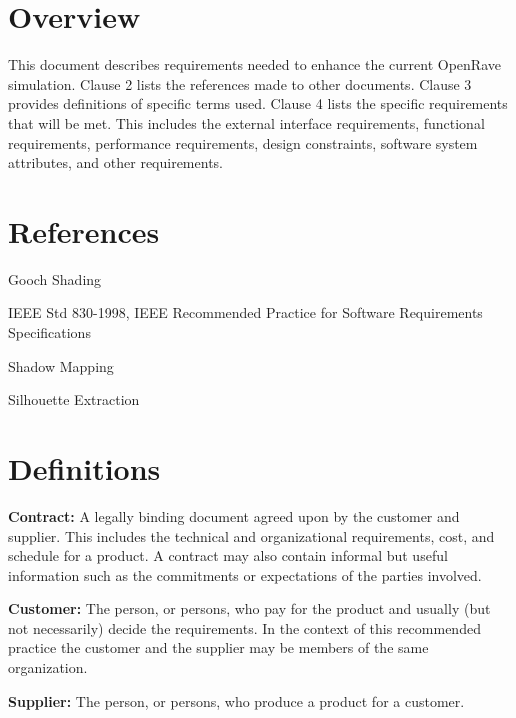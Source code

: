 \documentclass[10pt,journal,compsoc]{IEEEtran}
\begin{document}
\newpage
\begin{flushleft}
\section{Overview}
\vspace{3mm}
This document describes requirements needed to enhance the current OpenRave simulation. 
Clause 2 lists the references made to other documents. 
Clause 3 provides definitions of specific terms used.
Clause 4 lists the specific requirements that will be met.
This includes the external interface requirements, functional requirements, performance requirements, design constraints, software system attributes, and other requirements.

\section{References}
\vspace{3mm}

Gooch Shading 
\vspace{3mm}

IEEE Std 830-1998, IEEE Recommended Practice for Software Requirements Specifications 
\vspace{3mm}

Shadow Mapping 
\vspace{3mm}

Silhouette Extraction 

\section{Definitions}

\vspace{3mm}
\textbf{Contract:}
A legally binding document agreed upon by the customer and supplier. This includes the technical and organizational requirements, cost, and schedule for a product. A contract may also contain informal but useful information such as the commitments or expectations of the parties involved.

\vspace{3mm}
\textbf{Customer:}
The person, or persons, who pay for the product and usually (but not necessarily) decide the requirements. In the context of this recommended practice the customer and the supplier may be members of the same organization.

\vspace{3mm}
\textbf{Supplier:}
The person, or persons, who produce a product for a customer.


\end{flushleft}
\end{document}
